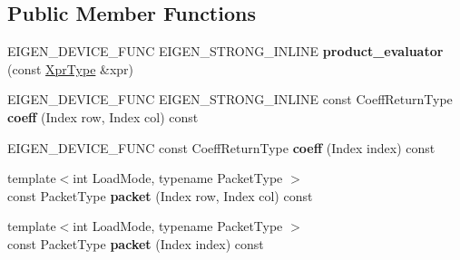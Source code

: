\subsection*{Public Member Functions}
\begin{DoxyCompactItemize}
\item 
\mbox{\label{struct_eigen_1_1internal_1_1product__evaluator_3_01_product_3_01_lhs_00_01_rhs_00_01_lazy_produc1ed1c0c8715953d10d735722e273406b_ac548c5199c519973bcc70ab8804a07a1}} 
E\+I\+G\+E\+N\+\_\+\+D\+E\+V\+I\+C\+E\+\_\+\+F\+U\+NC E\+I\+G\+E\+N\+\_\+\+S\+T\+R\+O\+N\+G\+\_\+\+I\+N\+L\+I\+NE {\bfseries product\+\_\+evaluator} (const \mbox{\hyperlink{class_eigen_1_1_product}{Xpr\+Type}} \&xpr)
\item 
\mbox{\label{struct_eigen_1_1internal_1_1product__evaluator_3_01_product_3_01_lhs_00_01_rhs_00_01_lazy_produc1ed1c0c8715953d10d735722e273406b_af925042c9a63ad692a886216fff55ede}} 
E\+I\+G\+E\+N\+\_\+\+D\+E\+V\+I\+C\+E\+\_\+\+F\+U\+NC E\+I\+G\+E\+N\+\_\+\+S\+T\+R\+O\+N\+G\+\_\+\+I\+N\+L\+I\+NE const Coeff\+Return\+Type {\bfseries coeff} (Index row, Index col) const
\item 
\mbox{\label{struct_eigen_1_1internal_1_1product__evaluator_3_01_product_3_01_lhs_00_01_rhs_00_01_lazy_produc1ed1c0c8715953d10d735722e273406b_a0e38571e46949b5e1c2fef05b678991b}} 
E\+I\+G\+E\+N\+\_\+\+D\+E\+V\+I\+C\+E\+\_\+\+F\+U\+NC const Coeff\+Return\+Type {\bfseries coeff} (Index index) const
\item 
\mbox{\label{struct_eigen_1_1internal_1_1product__evaluator_3_01_product_3_01_lhs_00_01_rhs_00_01_lazy_produc1ed1c0c8715953d10d735722e273406b_a4eba9df6ab16407aacea9aa27cc45d26}} 
{\footnotesize template$<$int Load\+Mode, typename Packet\+Type $>$ }\\const Packet\+Type {\bfseries packet} (Index row, Index col) const
\item 
\mbox{\label{struct_eigen_1_1internal_1_1product__evaluator_3_01_product_3_01_lhs_00_01_rhs_00_01_lazy_produc1ed1c0c8715953d10d735722e273406b_a8fb3c1ed031ee74206f897a99100dede}} 
{\footnotesize template$<$int Load\+Mode, typename Packet\+Type $>$ }\\const Packet\+Type {\bfseries packet} (Index index) const
\end{DoxyCompactItemize}
